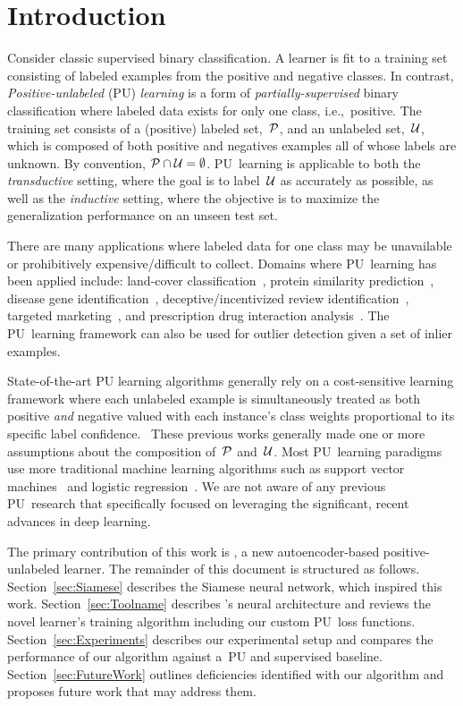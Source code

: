 \section{Introduction}

Consider classic supervised binary classification.  A learner is fit to a training set consisting of labeled examples from the positive and negative classes.  In contrast, \textit{Positive-unlabeled} (PU) \textit{learning} is a form of \textit{partially-supervised} binary classification where labeled data exists for only one class, i.e.,~positive.  The training set consists of a (positive) labeled set,~$\mathcal{P}$, and an unlabeled set,~$\mathcal{U}$, which is composed of both positive and negatives examples all of whose labels are unknown.  By convention, ${\mathcal{P}\cap\mathcal{U}=\emptyset}$.  PU~learning is applicable to both the \textit{transductive} setting, where the goal is to label~$\mathcal{U}$ as accurately as possible, as well as the \textit{inductive} setting, where the objective is to maximize the generalization performance on an unseen test set.

There are many applications where labeled data for one class may be unavailable or prohibitively expensive/difficult to collect. Domains where PU~learning has been applied include: land-cover classification~\cite{Li:2011}, protein similarity prediction~\cite{Elkan:2008}, disease gene identification~\cite{Yang:2012}, deceptive/incentivized review identification~\cite{Ren:2014}, targeted marketing~\cite{Yi:2017}, and prescription drug interaction analysis~\cite{Liu:2017}. The PU~learning framework can also be used for outlier detection given a set of inlier examples.~\cite{Scott:2009}

State-of-the-art PU learning algorithms generally rely on a cost-sensitive learning framework where each unlabeled example is simultaneously treated as both positive \textit{and} negative valued with each instance's class weights proportional to its specific label confidence.~\cite{Elkan:2008}  These previous works generally made one or more assumptions about the composition of~$\mathcal{P}$ and~$\mathcal{U}$. Most PU~learning paradigms use more traditional machine learning algorithms such as support vector machines~\cite{Elkan:2008} and logistic regression~\cite{Lee:2003}.  We are not aware of any previous PU~research that specifically focused on leveraging the significant, recent advances in deep learning.

The primary contribution of this work is \textit{\toolname}, a new autoencoder-based positive-unlabeled learner.  The remainder of this document is structured as follows.  Section~\ref{sec:Siamese} describes the Siamese neural network, which inspired this work.  Section~\ref{sec:Toolname} describes \toolname's neural architecture and reviews the novel learner's training algorithm including our custom PU~loss functions.  Section~\ref{sec:Experiments} describes our experimental setup and compares the performance of our algorithm against a~PU and supervised baseline.  Section~\ref{sec:FutureWork} outlines deficiencies identified with our algorithm and proposes future work that may address them.

